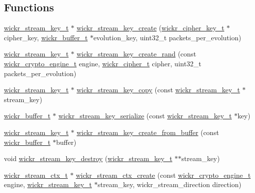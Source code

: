 \subsection*{Functions}
\begin{DoxyCompactItemize}
\item 
\hyperlink{structwickr__stream__key}{wickr\+\_\+stream\+\_\+key\+\_\+t} $\ast$ \hyperlink{group__wickr__stream_ga54449667a25d9e64cd04dae58dd76418}{wickr\+\_\+stream\+\_\+key\+\_\+create} (\hyperlink{structwickr__cipher__key}{wickr\+\_\+cipher\+\_\+key\+\_\+t} $\ast$cipher\+\_\+key, \hyperlink{structwickr__buffer}{wickr\+\_\+buffer\+\_\+t} $\ast$evolution\+\_\+key, uint32\+\_\+t packets\+\_\+per\+\_\+evolution)
\item 
\hyperlink{structwickr__stream__key}{wickr\+\_\+stream\+\_\+key\+\_\+t} $\ast$ \hyperlink{group__wickr__stream_ga9e95dd486dbe2f3db647c65042601b34}{wickr\+\_\+stream\+\_\+key\+\_\+create\+\_\+rand} (const \hyperlink{structwickr__crypto__engine}{wickr\+\_\+crypto\+\_\+engine\+\_\+t} engine, \hyperlink{structwickr__cipher}{wickr\+\_\+cipher\+\_\+t} cipher, uint32\+\_\+t packets\+\_\+per\+\_\+evolution)
\item 
\hyperlink{structwickr__stream__key}{wickr\+\_\+stream\+\_\+key\+\_\+t} $\ast$ \hyperlink{group__wickr__stream_ga0201dd73adf773834d7dbb4bbc307fae}{wickr\+\_\+stream\+\_\+key\+\_\+copy} (const \hyperlink{structwickr__stream__key}{wickr\+\_\+stream\+\_\+key\+\_\+t} $\ast$stream\+\_\+key)
\item 
\hyperlink{structwickr__buffer}{wickr\+\_\+buffer\+\_\+t} $\ast$ \hyperlink{group__wickr__stream_gae1540c98a88e2f62e96fb2ee209e2290}{wickr\+\_\+stream\+\_\+key\+\_\+serialize} (const \hyperlink{structwickr__stream__key}{wickr\+\_\+stream\+\_\+key\+\_\+t} $\ast$key)
\item 
\hyperlink{structwickr__stream__key}{wickr\+\_\+stream\+\_\+key\+\_\+t} $\ast$ \hyperlink{group__wickr__stream_gadf1565329fed927531e1a14334ed23e4}{wickr\+\_\+stream\+\_\+key\+\_\+create\+\_\+from\+\_\+buffer} (const \hyperlink{structwickr__buffer}{wickr\+\_\+buffer\+\_\+t} $\ast$buffer)
\item 
void \hyperlink{group__wickr__stream_ga3bb3dec760c5b7f3a1bd2d0bb13bcc79}{wickr\+\_\+stream\+\_\+key\+\_\+destroy} (\hyperlink{structwickr__stream__key}{wickr\+\_\+stream\+\_\+key\+\_\+t} $\ast$$\ast$stream\+\_\+key)
\item 
\hyperlink{structwickr__stream__ctx}{wickr\+\_\+stream\+\_\+ctx\+\_\+t} $\ast$ \hyperlink{group__wickr__stream_ga0b5c513a3e0958dc7fd4f8455206e32e}{wickr\+\_\+stream\+\_\+ctx\+\_\+create} (const \hyperlink{structwickr__crypto__engine}{wickr\+\_\+crypto\+\_\+engine\+\_\+t} engine, \hyperlink{structwickr__stream__key}{wickr\+\_\+stream\+\_\+key\+\_\+t} $\ast$stream\+\_\+key, wickr\+\_\+stream\+\_\+direction direction)
$$
\end{DoxyCompactItemize}
